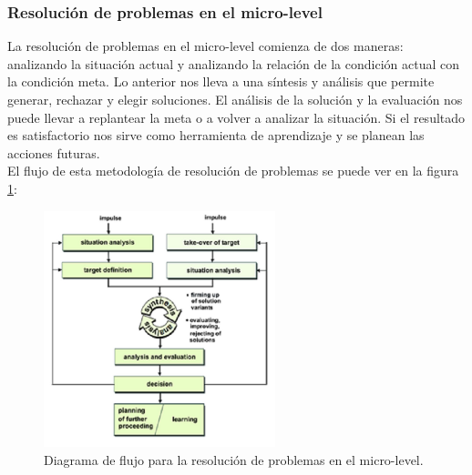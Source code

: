 \subsubsection{Resolución de problemas en el micro-level}
La resolución de problemas en el micro-level comienza de dos maneras: analizando la situación actual y analizando la relación de la condición actual con la condición meta. Lo anterior nos lleva a una síntesis y análisis que permite generar, rechazar y elegir soluciones. El análisis de la solución y la evaluación nos puede llevar a replantear la meta o a volver a analizar la situación. Si el resultado es satisfactorio nos sirve como herramienta de aprendizaje y se planean las acciones futuras. \\
El flujo de esta metodología de resolución de problemas se puede ver en la figura \ref{fig:DiagramaMicroLevel}:
\begin{figure}[!htb]
    \centering
    \includegraphics[width=0.6\textwidth]{imagenes/3.jpg}
    \caption{Diagrama de flujo para la resolución de problemas en el micro-level.}
    \label{fig:DiagramaMicroLevel}
\end{figure}
\FloatBarrier

